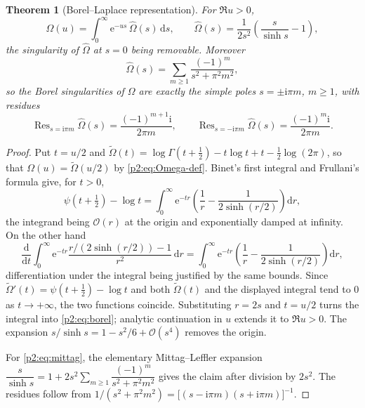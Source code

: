 \documentclass[11pt,a4paper,oneside]{book}
\theoremstyle{plain}
\newtheorem{theorem}{Theorem}[chapter]
\theoremstyle{definition}
\theoremstyle{remark}
\newcommand{\e}{\mathrm{e}}
\newcommand{\ii}{\mathrm{i}}
\newcommand{\dd}{\mathrm{d}}
\newcommand{\bigO}{\mathcal{O}}
\DeclareMathOperator{\Res}{Res}
\begin{document}
\begin{theorem}[Borel--Laplace representation]
\label{p2:thm:borel}
For \(\Re u>0\),
\begin{equation}
 \Omega(u)=\int_0^\infty\e^{-us}\,\widehat\Omega(s)\,\dd s,
 \qquad
 \widehat\Omega(s)=\frac1{2s^2}\left(\frac s{\sinh s}-1\right),
 \label{p2:eq:borel}
\end{equation}
the singularity of \(\widehat\Omega\) at \(s=0\) being removable.  Moreover
\begin{equation}
 \widehat\Omega(s)=\sum_{m\ge1}\frac{(-1)^m}{s^2+\pi^2m^2},
 \label{p2:eq:mittag}
\end{equation}
so the Borel singularities of \(\Omega\) are exactly the simple poles
\(s=\pm\ii\pi m\), \(m\ge1\), with residues
\begin{equation}
 \Res_{s=\ii\pi m}\widehat\Omega(s)=\frac{(-1)^{m+1}\ii}{2\pi m},
 \qquad
 \Res_{s=-\ii\pi m}\widehat\Omega(s)=\frac{(-1)^{m}\ii}{2\pi m}.
 \label{p2:eq:residues}
\end{equation}
\end{theorem}

\begin{proof}
Put \(t=u/2\) and
\(\widetilde\Omega(t)=\log\Gamma(t+\tfrac12)-t\log t+t-\tfrac12\log(2\pi)\),
so that \(\Omega(u)=\widetilde\Omega(u/2)\) by \cref{p2:eq:Omega-def}.
Binet's first integral and Frullani's formula give, for \(t>0\),
\[
 \psi\!\left(t+\tfrac12\right)-\log t
 =\int_0^\infty\e^{-tr}
 \left(\frac1r-\frac1{2\sinh(r/2)}\right)\dd r,
\]
the integrand being \(\bigO(r)\) at the origin and exponentially damped at
infinity.  On the other hand
\[
 \frac{\dd}{\dd t}\int_0^\infty\e^{-tr}
 \frac{r/(2\sinh(r/2))-1}{r^2}\,\dd r
 =\int_0^\infty\e^{-tr}
 \left(\frac1r-\frac1{2\sinh(r/2)}\right)\dd r ,
\]
differentiation under the integral being justified by the same bounds.  Since
\(\widetilde\Omega'(t)=\psi(t+\tfrac12)-\log t\) and both
\(\widetilde\Omega(t)\) and the displayed integral tend to \(0\) as
\(t\to+\infty\), the two functions coincide.  Substituting \(r=2s\) and
\(t=u/2\) turns the integral into \cref{p2:eq:borel}; analytic continuation in
\(u\) extends it to \(\Re u>0\).  The expansion \(s/\sinh s=1-s^2/6+\bigO(s^4)\)
removes the origin.

For \cref{p2:eq:mittag}, the elementary Mittag--Leffler expansion
\(\dfrac s{\sinh s}=1+2s^2\sum_{m\ge1}\dfrac{(-1)^m}{s^2+\pi^2m^2}\)
gives the claim after division by \(2s^2\).  The residues follow from
\(1/(s^2+\pi^2m^2)=\bigl[(s-\ii\pi m)(s+\ii\pi m)\bigr]^{-1}\).
\end{proof}
\end{document}
